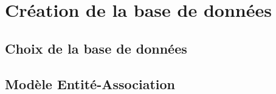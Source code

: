 \chapter{Création de la base de données}


    \section{Choix de la base de données}

        
    \section{Modèle Entité-Association}


